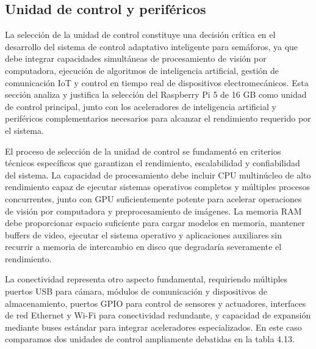 \documentclass[12pt,a4paper,oneside]{report}
\begin{document}
\subsection{Unidad de control y periféricos}\label{unidad-de-control-y-perifuxe9ricos}

La selección de la unidad de control constituye una decisión crítica en el desarrollo del sistema de control adaptativo inteligente para semáforos, ya que debe integrar capacidades simultáneas de procesamiento de visión por computadora, ejecución de algoritmos de inteligencia artificial, gestión de comunicación IoT y control en tiempo real de dispositivos electromecánicos. Esta sección analiza y justifica la selección del Raspberry Pi 5 de 16 GB como unidad de control principal, junto con los aceleradores de inteligencia artificial y periféricos complementarios necesarios para alcanzar el rendimiento requerido por el sistema.

El proceso de selección de la unidad de control se fundamentó en criterios técnicos específicos que garantizan el rendimiento, escalabilidad y confiabilidad del sistema. La capacidad de procesamiento debe incluir CPU multinúcleo de alto rendimiento capaz de ejecutar sistemas operativos completos y múltiples procesos concurrentes, junto con GPU suficientemente potente para acelerar operaciones de visión por computadora y preprocesamiento de imágenes. La memoria RAM debe proporcionar espacio suficiente para cargar modelos en memoria, mantener buffers de video, ejecutar el sistema operativo y aplicaciones auxiliares sin recurrir a memoria de intercambio en disco que degradaría severamente el rendimiento.

La conectividad representa otro aspecto fundamental, requiriendo múltiples puertos USB para cámara, módulos de comunicación y dispositivos de almacenamiento, puertos GPIO para control de sensores y actuadores, interfaces de red Ethernet y Wi-Fi para conectividad redundante, y capacidad de expansión mediante buses estándar para integrar aceleradores especializados. En este caso comparamos dos unidades de control ampliamente debatidas en la tabla 4.13.

\label{tbl:4.13}
\end{document}
